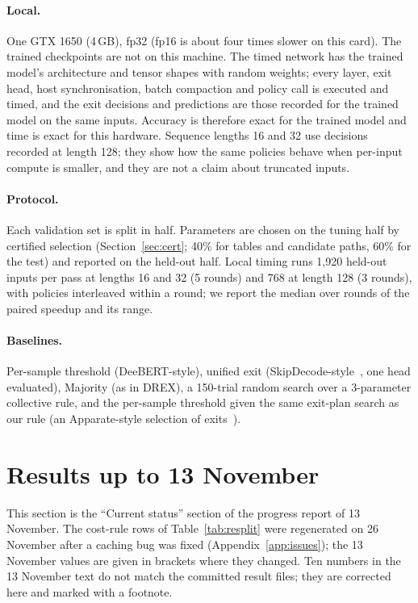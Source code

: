 \paragraph{Local.} One GTX 1650 (4\,GB), fp32 (fp16 is about four times slower on this card). The trained
checkpoints are not on this machine. The timed network has the trained model's architecture and tensor shapes with
random weights; every layer, exit head, host synchronisation, batch compaction and policy call is executed and timed,
and the exit decisions and predictions are those recorded for the trained model on the same inputs. Accuracy is
therefore exact for the trained model and time is exact for this hardware. Sequence lengths 16 and 32 use decisions
recorded at length 128; they show how the same policies behave when per-input compute is smaller, and they are not a
claim about truncated inputs.

\paragraph{Protocol.} Each validation set is split in half. Parameters are chosen on the tuning half by certified
selection (Section~\ref{sec:cert}; 40\% for tables and candidate paths, 60\% for the test) and reported on the
held-out half. Local timing runs 1{,}920 held-out inputs per pass at lengths 16 and 32 (5 rounds) and 768 at length
128 (3 rounds), with policies interleaved within a round; we report the median over rounds of the paired speedup and
its range.

\paragraph{Baselines.} Per-sample threshold (DeeBERT-style), unified exit (SkipDecode-style~\cite{skipdecode}, one
head evaluated), Majority (as in DREX), a 150-trial random search over a 3-parameter collective rule, and the
per-sample threshold given the same exit-plan search as our rule (an Apparate-style selection of exits~\cite{apparate}).

\section{Results up to 13 November}\label{sec:status}

This section is the ``Current status'' section of the progress report of 13 November. The cost-rule rows of
Table~\ref{tab:resplit} were regenerated on 26 November after a caching bug was fixed (Appendix~\ref{app:issues});
the 13 November values are given in brackets where they changed. Ten numbers in the 13 November text do not match
the committed result files; they are corrected here and marked with a footnote.

